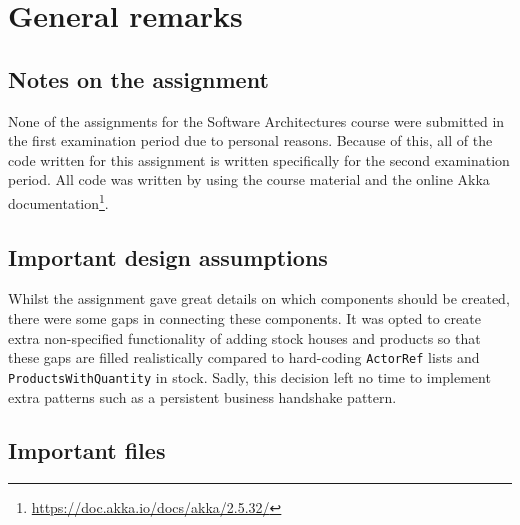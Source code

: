 \chapter{General remarks}
\label{ch:general_remarks}


\section{Notes on the assignment}
\label{sec:notes_on_ass}

None of the assignments for the Software Architectures course were submitted in the first examination period due to personal reasons.
Because of this, all of the code written for this assignment is written specifically for the second examination period.
All code was written by using the course material and the online Akka documentation\footnote{\url{https://doc.akka.io/docs/akka/2.5.32/}}.


\section{Important design assumptions}
\label{sec:design_assumptions}

Whilst the assignment gave great details on which components should be created, there were some gaps in connecting these components.
It was opted to create extra non-specified functionality of adding stock houses and products so that these gaps are filled realistically compared to hard-coding \texttt{ActorRef} lists and \texttt{ProductsWithQuantity} in stock.
Sadly, this decision left no time to implement extra patterns such as a persistent business handshake pattern.


\section{Important files}
\label{sec:important_files}

